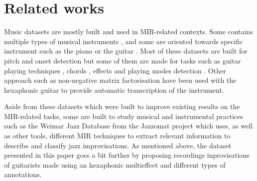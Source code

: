 \documentclass{article}
\begin{document}

\section{Related works}\label{sec:related_works}


Music datasets are mostly built and used in MIR-related contexts.  Some contains multiple types of musical instruments \cite{thickstun2017learning}, and some are oriented towards specific instrument such as the piano \cite{Emiya2010MAPS, hawthorne2018} or the guitar \cite{Kehling2014, sci:Xi2018}. Most of these datasets are built for pitch and onset detection but some of them are made for tasks such as guitar playing techniques \cite{sci:Su2014a}, chords \cite{nadar2019Chords}, effects \cite{Stein2010} and playing modes detection \cite{Foulon2014}.  Other approach such as non-negative matrix factorisation have been used with the hexaphonic guitar \cite{sci:OGrady2009} to provide automatic transcription of the instrument.

Aside from these datasets which were built to improve existing results on the MIR-related tasks, some are built to study musical and instrumental practices such as the Weimar Jazz Database from the Jazzomat project \cite{Pfleiderer:2017:BOOK} which uses, as well as other tools, different MIR techniques to extract relevant information to describe and classify jazz improvisations. As mentioned above, the dataset presented in this paper goes a bit further by proposing recordings inprovisations of guitarists made using an hexaphonic multieffect and different types of annotations.
\end{document}
